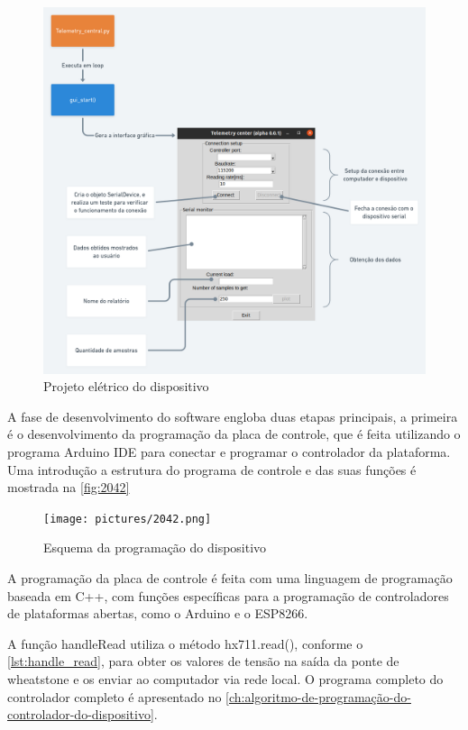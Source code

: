 \begin{figure}[H]
	\caption{\label{fig:2041} Projeto elétrico do dispositivo}
	\begin{center}
		\includegraphics[width=\textwidth]{pictures/2041.png}
	\end{center}
\end{figure}

A fase de desenvolvimento do software engloba duas etapas principais, a primeira é o desenvolvimento da programação da placa de controle,
que é feita utilizando o programa Arduino IDE para conectar e programar o controlador da plataforma.
Uma introdução a estrutura do programa de controle e das suas funções é mostrada na \autoref{fig:2042}

\begin{figure}[H]
	\caption{\label{fig:2042} Esquema da programação do dispositivo}
	\begin{center}
		\texttt{[image: pictures/2042.png]}
	\end{center}
\end{figure}

A programação da placa de controle é feita com uma linguagem de programação baseada em C++, com funções específicas para a programação de controladores de
plataformas abertas, como o Arduino e o ESP8266.

A função handleRead utiliza o método hx711.read(), conforme o \autoref{lst:handle_read}, para obter os valores de tensão na saída da ponte de wheatstone e os
enviar ao computador via rede local.
O programa completo do controlador completo é apresentado no \autoref{ch:algoritmo-de-programação-do-controlador-do-dispositivo}.

